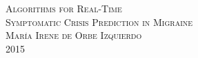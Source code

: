 \begin{titlepage}
\begin{adjustwidth}{-1cm}{-3cm}
\begin{center}
\vspace*{2cm} 
\textsc{Algorithms for Real-Time \\ Symptomatic Crisis Prediction in Migraine} \\ %

\vspace*{1cm} 
\textsc{María Irene de Orbe Izquierdo}
\vspace{0.5cm}
\hfill
\\
\textsc{2015}
        





    \end{center}  
\end{adjustwidth}       
\end{titlepage}   
\thispagestyle{empty}

